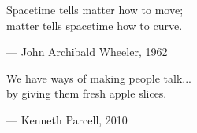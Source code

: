 \begin{flushright}
\begin{hangleftquote}{\QENOpen}{\QENClose}
Spacetime tells matter how to move;\\
matter tells spacetime how to curve.
\end{hangleftquote}
\par\smallskip
\normalfont — John Archibald Wheeler, 1962
\end{flushright}
\vspace{2em}
\begin{flushright}
\begin{hangleftquote}{\QENOpen}{\QENClose}
We have ways of making people talk...\\
by giving them fresh apple slices.
\end{hangleftquote}
\par\smallskip
\normalfont — Kenneth Parcell, 2010
\end{flushright}
